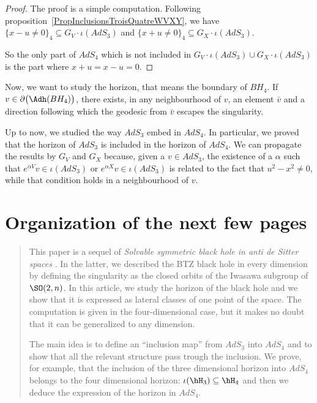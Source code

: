 	\begin{proof}
		The proof is a simple computation. Following proposition~\ref{PropInclusionsTroisQuatreWVXY}, we have $\{ x-u\neq 0 \}_4\subseteq G_V\cdot\iota(AdS_3)$ and $\{ x+u\neq 0 \}_4\subseteq G_X\cdot\iota(AdS_3)$.

		So the only part of $AdS_4$ which is not included in $G_V\cdot \iota(AdS_3)\cup G_X\cdot\iota(AdS_3)$ is the part where $x+u=x-u=0$.
	\end{proof}

	Now, we want to study the horizon, that means the boundary of $BH_4$. If $v\in\partial\big(\Adh(BH_4) \big)$, there exists, in any neighbourhood of $v$, an element $\bar v$ and a direction following which the geodesic from $\bar v$ escapes the singularity.

	Up to now, we studied the way $AdS_3$ embed in $AdS_4$. In particular, we proved that the horizon of $AdS_3$ is included in the horizon of $AdS_4$. We can propagate the results by $G_V$ and $G_X$ because, given a $v\in AdS_3$, the existence of a $\alpha$ such that $ e^{\alpha V}v\in\iota(AdS_3)$ or $ e^{\alpha X}v\in\iota(AdS_3)$ is related to the fact that $u^2-x^2\neq 0$, while that condition holds in a neighbourhood of $v$.

	\section{Organization of the next few pages}

	\begin{abstract}
		This paper is a sequel of \emph{Solvable symmetric black hole in anti de Sitter spaces} \cite{lcTNAdS}. In the latter, we described the BTZ black hole in every dimension by defining the singularity as the closed orbits of the Iwasawa subgroup of $\SO(2,n)$. In this article, we study the horizon of the black hole and we show that it is expressed as lateral classes of one point of the space. The computation is given in the four-dimensional case, but it makes no doubt that it can be generalized to any dimension.

		The main idea is to define an ``inclusion map'' from $AdS_3$ into $AdS_4$ and to show that all the relevant structure pass trough the inclusion. We prove, for example, that the inclusion of the three dimensional horizon into $AdS_4$ belongs to the four dimensional horizon: $\iota(\hH_3)\subseteq\hH_4$ and then we deduce the expression of the horizon in $AdS_4$.
	\end{abstract}

